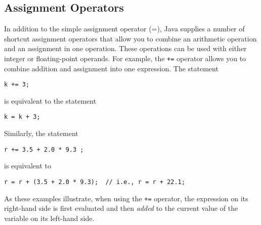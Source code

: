 
\subsection{Assignment Operators}
\noindent In addition to the simple assignment
operator (=), Java supplies a number of shortcut
assignment operators that allow you to combine an arithmetic operation
and an assignment in one operation.  These operations can be used with
either integer or floating-point operands.  For example, the {\tt +=}
operator allows you to combine addition and assignment into one
expression.  The statement

\begin{jjjlisting}
\begin{lstlisting}
k += 3;
\end{lstlisting}
\end{jjjlisting}

\noindent is equivalent to the statement

\begin{jjjlisting}
\begin{lstlisting}
k = k + 3;
\end{lstlisting}
\end{jjjlisting}

\noindent Similarly, the statement

\begin{jjjlisting}
\begin{lstlisting}
r += 3.5 + 2.0 * 9.3 ;
\end{lstlisting}
\end{jjjlisting}

\noindent is equivalent to

\begin{jjjlisting}
\begin{lstlisting}
r = r + (3.5 + 2.0 * 9.3);  // i.e., r = r + 22.1;
\end{lstlisting}
\end{jjjlisting}

\noindent As these examples illustrate, when using the {\tt +=}
operator, the expression on its right-hand side is first evaluated
and then {\it added} to the current value of the variable on its left-hand side.


